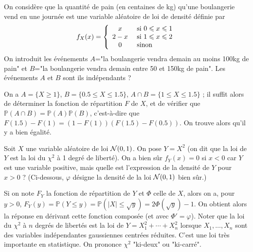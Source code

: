 \begin{question}
On considère que la quantité de pain (en centaines de kg) qu'une boulangerie vend en une journée est une variable aléatoire de loi de densité définie par 
\[
 f_X(x) = \left\{  \begin{array}[c]{cl} x & \mbox{ si $0\leq x\leq 1$} \\ 2-x & \mbox{ si $1\leq x\leq 2$} \\ 0 & \mbox{ sinon}    \end{array} \right. 
\]
On introduit les événements $A$="la boulangerie vendra demain au moins 100kg de pain" et $B$="la boulangerie vendra demain entre 50 et 150kg de pain". Les événements $A$ et $B$ sont ils indépendants ? 
\begin{answers}
\end{answers}
\begin{explanations}
On a $A = \{ X \geq 1 \}$, $B = \{ 0.5 \leq X \leq 1.5 \}$, $A \cap B = \{ 1 \leq X \leq 1.5 \}$ ; il suffit alors de déterminer la fonction de répartition $F$ de $X$, et de vérifier que $\mathbb{P}( A \cap B ) = \mathbb{P}(A)  \mathbb{P}(B)$, c'est-à-dire que $F(1.5) - F(1) = (1-F(1)) (F(1.5) - F(0.5))$. On trouve alors qu'il y a bien égalité.
\end{explanations}
\end{question}


\begin{question}
Soit $X$ une variable aléatoire de loi ${\cal N}(0,1)$. On pose $Y=X^2$ (on dit que la loi de $Y$ est la loi du $\chi^2$ à 1 degré de liberté).  On a bien sûr $f_Y(x)=0$ si $x<0$ car $Y$ est une variable positive, mais quelle est l'expression de la densité de $Y$ pour $x>0$ ? (Ci-dessous, $\varphi$ désigne la densité de la loi ${\cal N}(0,1)$ bien sûr.)
\begin{answers}
\end{answers}
\begin{explanations}
Si on note $F_Y$ la fonction de répartition de $Y$ et $\Phi$ celle de $X$, alors on a, pour $y>0$, $F_Y(y)= \mathbb{P}(Y\leq y)=\mathbb{P}(|X|\leq \sqrt{y})=2\Phi(\sqrt{y})-1$. On obtient alors la réponse en dérivant cette fonction composée (et avec $\Phi'=\varphi$). Noter que  la loi du $\chi^2$ à $n$ degrés de libertés est la loi de $Y=X_1^2+\cdots+X_n^2$ lorsque $X_1,\ldots,X_n$ sont des variables indépendantes gaussiennes centrées réduites. C'est une loi très importante en statistique. On prononce $\chi^2$ "ki-deux" ou "ki-carré". %
\end{explanations}
\end{question}



